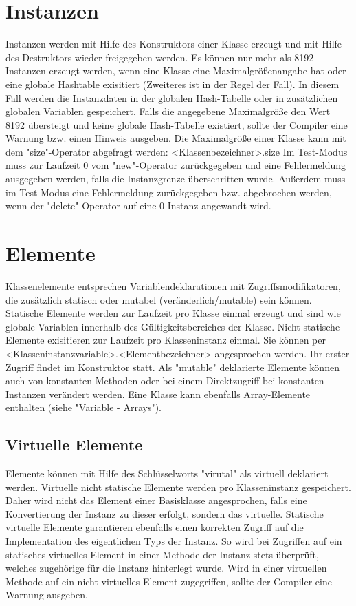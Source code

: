 \section{Instanzen}
Instanzen werden mit Hilfe des Konstruktors einer Klasse erzeugt und mit Hilfe des Destruktors wieder freigegeben werden.
Es können nur mehr als 8192 Instanzen erzeugt werden, wenn eine Klasse eine Maximalgrößenangabe hat oder eine globale Hashtable exisitiert (Zweiteres ist in der Regel der Fall).
In diesem Fall werden die Instanzdaten in der globalen Hash-Tabelle oder in zusätzlichen globalen Variablen gespeichert.
Falls die angegebene Maximalgröße den Wert 8192 übersteigt und keine globale Hash-Tabelle existiert,
sollte der Compiler eine Warnung bzw. einen Hinweis ausgeben.
Die Maximalgröße einer Klasse kann mit dem "size"-Operator abgefragt werden: <Klassenbezeichner>.size
Im Test-Modus muss zur Laufzeit 0 vom "new"-Operator zurückgegeben und eine Fehlermeldung ausgegeben werden, falls die Instanzgrenze
überschritten wurde.
Außerdem muss im Test-Modus eine Fehlermeldung zurückgegeben bzw. abgebrochen werden, wenn der "delete"-Operator auf eine 0-Instanz angewandt wird.

\section{Elemente}
Klassenelemente entsprechen Variablendeklarationen mit Zugriffsmodifikatoren, die zusätzlich statisch oder mutabel (veränderlich/mutable) sein können.
Statische Elemente werden zur Laufzeit pro Klasse einmal erzeugt und sind wie globale Variablen innerhalb des Gültigkeitsbereiches der Klasse.
Nicht statische Elemente exisitieren zur Laufzeit pro Klasseninstanz einmal.
Sie können per <Klasseninstanzvariable>.<Elementbezeichner> angesprochen werden.
Ihr erster Zugriff findet im Konstruktor statt.
Als "mutable" deklarierte Elemente können auch von konstanten Methoden oder bei einem Direktzugriff bei konstanten Instanzen verändert werden.
Eine Klasse kann ebenfalls Array-Elemente enthalten (siehe "Variable - Arrays").

\subsection{Virtuelle Elemente}
Elemente können mit Hilfe des Schlüsselworts "virutal" als virtuell deklariert werden. Virtuelle nicht statische Elemente werden pro
Klasseninstanz gespeichert. Daher wird nicht das Element einer Basisklasse angesprochen, falls eine Konvertierung der Instanz zu
dieser erfolgt, sondern das virtuelle.
Statische virtuelle Elemente garantieren ebenfalls einen korrekten Zugriff auf die Implementation des eigentlichen Typs der Instanz.
So wird bei Zugriffen auf ein statisches virtuelles Element in einer Methode der Instanz stets überprüft, welches zugehörige für die
Instanz hinterlegt wurde.
Wird in einer virtuellen Methode auf ein nicht virtuelles Element zugegriffen, sollte der Compiler eine Warnung ausgeben.

